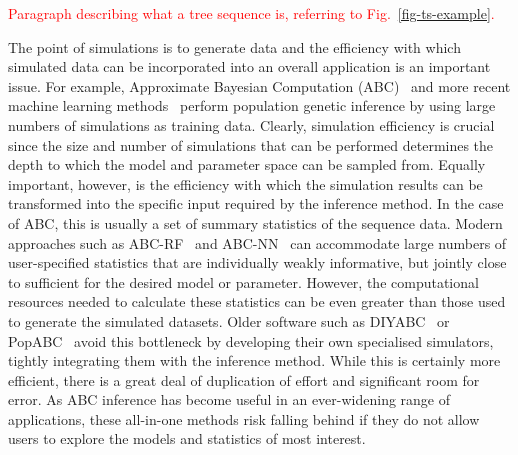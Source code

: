\documentclass{article}
\newcommand{\jkcomment}[1]{\textcolor{red}{#1}}
\begin{document}
\jkcomment{Paragraph describing what a tree sequence is, referring to
Fig.~\ref{fig-ts-example}.}


The point of simulations is to generate data and the efficiency with
which simulated data can be incorporated into an overall application
is an important issue.
For example, Approximate Bayesian Computation
(ABC)~\citep{beaumont2002approximate,csillery2010approximate,wegmann2010abctoolbox}
and more recent machine learning
methods~\citep{sheehan2016deep,schrider2018supervised,flagel2019unreasonable}
perform population genetic inference by using large numbers of
simulations as training data. Clearly, simulation efficiency is
crucial since the size and number of simulations that can be performed determines
the depth to which the model and parameter space can be sampled from.
Equally important,
however, is the efficiency with which the simulation results can be
transformed into the specific input required by the inference method.
In the case of ABC, this is usually a set of summary statistics of the sequence data.
Modern approaches such as
ABC-RF~\citep{raynal2019abc,pudlo2016abc} and
ABC-NN~\citep{csillery2012abc,blum2010abc} can accommodate large
numbers of user-specified statistics that are individually weakly informative,
but jointly close to sufficient for the desired model or parameter.
However, the computational resources needed to calculate these statistics can be even
greater than those used to generate the simulated datasets.
Older software such as DIYABC~\citep{cornuet2008inferring}
or PopABC~\citep{lopes2009popabc} avoid this bottleneck by
developing their own specialised simulators, tightly integrating them
with the inference method. While this is certainly more efficient,
there is a great deal of duplication of effort and significant
room for error.
As ABC inference has become useful in an ever-widening range of applications,
these all-in-one methods risk falling behind if they do not allow users to explore
the models and statistics of most interest.
\end{document}
